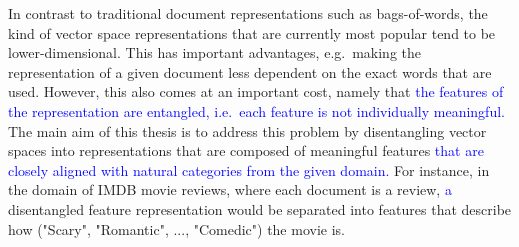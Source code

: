 \documentclass[a4paper,oneside,onecolumn,openright,12pt]{book}
\newcommand\hmark[1]{\textcolor{blue}{#1}}
\begin{document}


















In contrast to traditional document representations such as bags-of-words, the kind of vector space representations that are currently most popular tend to be lower-dimensional. This has important advantages, e.g.\ making the representation of a given document less dependent on the exact words that are used. However, this also comes at an important cost, namely that \hmark{the features of the representation are entangled, i.e.\ each feature is not  individually meaningful.} The main aim of this thesis is to address this problem  by disentangling   vector spaces into representations that are composed of  meaningful features \hmark{ that are closely aligned with natural categories from the given domain.} For instance, in the domain of IMDB movie reviews, where each document is a review, \hmark{a} disentangled feature representation would be separated into features that describe how ("Scary", "Romantic", ..., "Comedic") the  movie is. 
\end{document}
